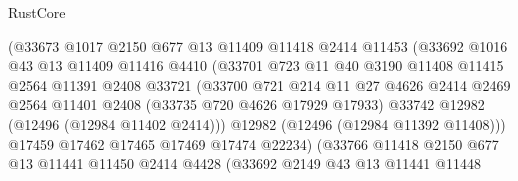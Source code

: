 \begin{lexlean}{RustCore}
\begin{coremodule}
                            (@33673
                              @1017
                              @2150
                              @677
                              @13
                              @11409
                              @11418
                              @2414
                              @11453
                              (@33692
                                @1016
                                @43
                                @13
                                @11409
                                @11416
                                @4410
                                (@33701
                                  @723
                                  @11
                                  @40
                                  @3190
                                  @11408
                                  @11415
                                  @2564
                                  @11391
                                  @2408
                                  @33721
                                  (@33700
                                    @721
                                    @214
                                    @11
                                    @27
                                    @4626
                                    @2414
                                    @2469
                                    @2564
                                    @11401
                                    @2408
                                    (@33735 @720 @4626 @17929 @17933)
                                    @33742
                                    @12982
                                    (@12496 (@12984 @11402 @2414)))
                                  @12982
                                  (@12496 (@12984 @11392 @11408)))
                                @17459
                                @17462
                                @17465
                                @17469
                                @17474
                                @22234)
                              (@33766
                                @11418
                                @2150
                                @677
                                @13
                                @11441
                                @11450
                                @2414
                                @4428
                                (@33692
                                  @2149
                                  @43
                                  @13
                                  @11441
                                  @11448

\end{coremodule}
\end{lexlean}
